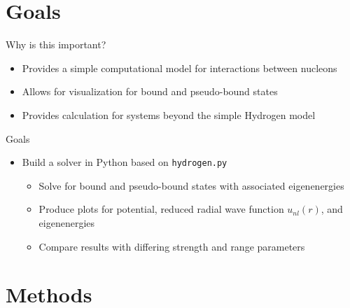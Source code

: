 \documentclass{beamer}
\begin{document}
\section{Goals}

\begin{frame}{Why is this important?}
    \begin{itemize}[<+-| alert@+>]
        \item Provides a simple computational model for interactions between nucleons
        \item Allows for visualization for bound and pseudo-bound states
        \item Provides calculation for systems beyond the simple Hydrogen model
    \end{itemize}
\end{frame}

\begin{frame}{Goals}
    \begin{itemize}[<+-| alert@+>]
        \item Build a solver in Python based on \texttt{hydrogen.py}
        \begin{itemize}
            \item Solve for bound and pseudo-bound states with associated eigenenergies
            \item Produce plots for potential, reduced radial wave function $u_{nl}(r)$, and eigenenergies
            \item Compare results with differing strength and range parameters
        \end{itemize}
    \end{itemize}
\end{frame}


\section{Methods}
\end{document}
